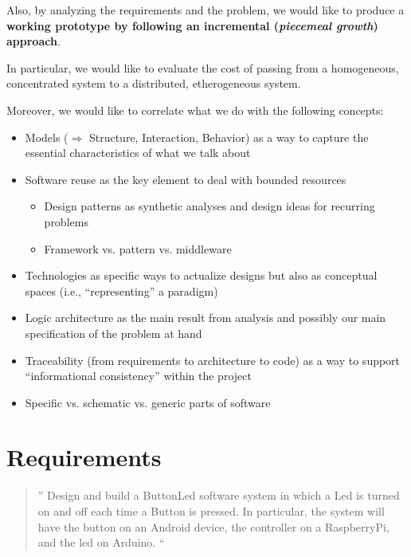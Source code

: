 \documentclass{article}
\newcommand{\labelsec}[1]{\label{sec:#1}}
\begin{document}
Also, by analyzing the requirements and the problem, we would like to produce a
\textbf{working prototype by following an incremental (\emph{piecemeal growth})
approach}.

In particular, we would like to evaluate the cost of passing from a homogeneous,
concentrated system to a distributed, etherogeneous system.

Moreover, we would like to correlate what we do with the following concepts:

\begin{itemize}
  \item Models ($\Rightarrow$ Structure, Interaction, Behavior) as a way to
  capture the essential characteristics of what we talk about
  \item Software reuse as the key element to deal with bounded resources
     \begin{itemize}
       \item Design patterns as synthetic analyses and design ideas for
       recurring problems
       \item Framework vs. pattern vs. middleware
	 \end{itemize}
  \item Technologies as specific ways to actualize designs but also as
  conceptual spaces (i.e., ``representing'' a paradigm)
  \item Logic architecture as the main result from analysis and possibly our
  main specification of the problem at hand
  \item Traceability (from requirements to architecture to code) as a way to
  support ``informational consistency'' within the project
  \item Specific vs. schematic vs. generic parts of software
\end{itemize}



\section{Requirements}
\labelsec{Requirements}

\begin{quote}''
Design and build a ButtonLed software system in which a Led is turned on and off
each time a Button is pressed.
In particular, the system will have the button on an Android device, 
 the controller on a RaspberryPi, and the led on Arduino.
``\end{quote}
\end{document}
